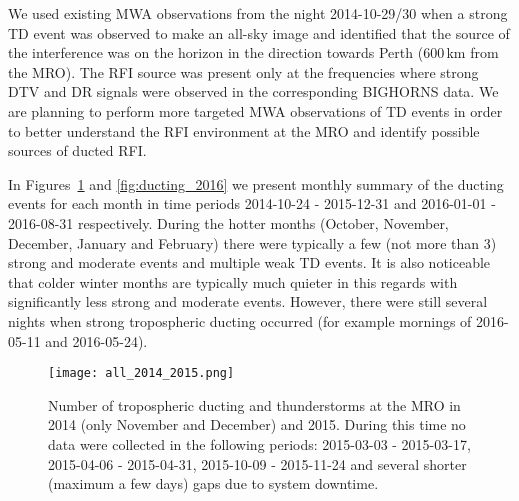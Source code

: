 \documentclass{article}
\begin{document}
We used existing MWA observations from the night 2014-10-29/30 when a strong TD event was observed \citep{bighorns_rfi_paper} to make an all-sky image and identified that the source of the interference was on the horizon in the direction towards Perth (600\,km from the MRO).
The RFI source was present only at the frequencies where strong DTV and DR signals were observed in the corresponding BIGHORNS data.
We are planning to perform more targeted MWA observations of TD events in order to better understand the RFI environment at the MRO and identify possible sources of ducted RFI.

In Figures~\ref{fig:ducting_2014_2015} and \ref{fig:ducting_2016} we present monthly summary of the ducting events for each month in time periods 2014-10-24 - 2015-12-31 and 2016-01-01 - 2016-08-31 respectively.
During the hotter months (October, November, December, January and February) there were typically a few (not more than 3) strong and moderate events and multiple weak TD events. 
It is also noticeable that colder winter months are typically much quieter in this regards with significantly less strong and moderate events. However, there were still several nights when strong tropospheric ducting occurred (for example mornings of 2016-05-11 and 2016-05-24).

\begin{figure}[]
\centering
\texttt{[image: all\_2014\_2015.png]}
\caption{Number of tropospheric ducting and thunderstorms at the MRO in 2014 (only November and December) and 2015. During this time no data were collected in the following periods: 2015-03-03 - 2015-03-17, 2015-04-06 - 2015-04-31, 2015-10-09 - 2015-11-24 and several shorter (maximum a few days) gaps due to system downtime.}
\label{fig:ducting_2014_2015}
\end{figure}

\end{document}
